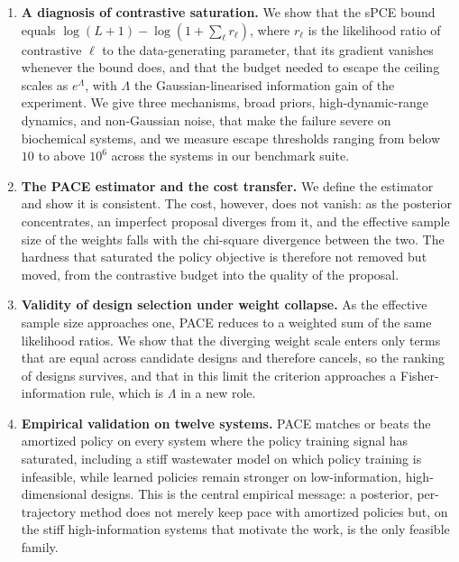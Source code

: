 \begin{enumerate}[leftmargin=*,itemsep=0.25em]
  \item \textbf{A diagnosis of contrastive saturation.} We show that the sPCE bound
  equals $\log(L+1)-\log(1+\sum_\ell r_\ell)$, where $r_\ell$ is the likelihood ratio of
  contrastive $\ell$ to the data-generating parameter, that its gradient vanishes whenever
  the bound does, and that the budget needed to escape the ceiling scales as $e^{\Lambda}$,
  with $\Lambda$ the Gaussian-linearised information gain of the experiment. We give three
  mechanisms, broad priors, high-dynamic-range dynamics, and non-Gaussian noise, that make
  the failure severe on biochemical systems, and we measure escape thresholds ranging from
  below $10$ to above $10^6$ across the systems in our benchmark suite.

  \item \textbf{The PACE estimator and the cost transfer.} We define the estimator and show it is
  consistent. The cost, however, does not vanish: as the posterior concentrates, an imperfect
  proposal diverges from it, and the effective sample size of the weights falls with the chi-square
  divergence between the two. The hardness that saturated the policy objective is therefore not
  removed but moved, from the contrastive budget into the quality of the proposal.

  \item \textbf{Validity of design selection under weight collapse.} As the effective
  sample size approaches one, PACE reduces to a weighted sum of the same likelihood ratios.
  We show that the diverging weight scale enters only terms that are equal across candidate
  designs and therefore cancels, so the ranking of designs survives, and that in this limit
  the criterion approaches a Fisher-information rule, which is $\Lambda$ in a new role.

  \item \textbf{Empirical validation on twelve systems.} PACE matches or beats the
  amortized policy on every system where the policy training signal has saturated,
  including a stiff wastewater model on which policy training is infeasible, while learned
  policies remain stronger on low-information, high-dimensional designs. This is the central
  empirical message: a posterior, per-trajectory method does not merely keep pace with
  amortized policies but, on the stiff high-information systems that motivate the work, is
  the only feasible family.
\end{enumerate}



